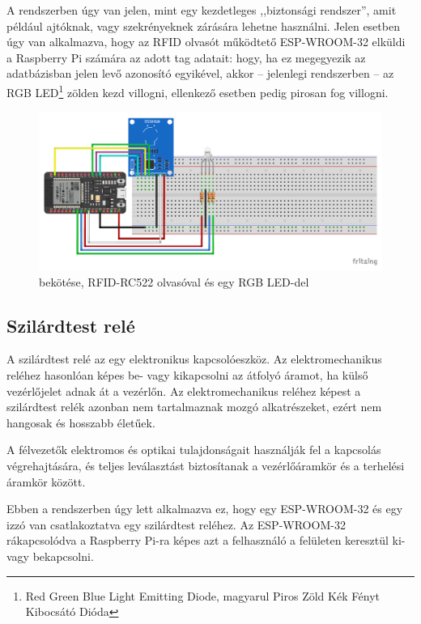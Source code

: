 \documentclass[
]{thesis-ekf}
\theoremstyle{definition}
\theoremstyle{remark}
\begin{document}
	A rendszerben úgy van jelen, mint egy kezdetleges ,,biztonsági rendszer'', amit például ajtóknak, vagy szekrényeknek zárására lehetne használni. Jelen esetben úgy van alkalmazva, hogy az RFID olvasót működtető ESP-WROOM-32 elküldi a Raspberry Pi számára az adott tag adatait: hogy, ha ez megegyezik az adatbázisban jelen levő azonosító egyikével, akkor -- jelenlegi rendszerben -- az RGB LED\footnote{\label{rgb-led}Red Green Blue Light Emitting Diode, magyarul Piros Zöld Kék Fényt Kibocsátó Dióda} zölden kezd villogni, ellenkező esetben pedig pirosan fog villogni.
	
	\begin{figure}[ht!]
		\centering
		\includegraphics[width=1\textwidth]{./src/schematics/RFID reader schematics_bb}
		\caption{ bekötése, RFID-RC522 olvasóval és egy RGB LED-del}
		\label{rfid-schematics}
	\end{figure}	
	
	\subsection{Szilárdtest relé}
	
	A szilárdtest relé az egy elektronikus kapcsolóeszköz. Az elektromechanikus reléhez hasonlóan képes be- vagy kikapcsolni az átfolyó áramot, ha külső vezérlőjelet adnak át a vezérlőn. Az elektromechanikus reléhez képest a szilárdtest relék azonban nem tartalmaznak mozgó alkatrészeket, ezért nem hangosak és hosszabb életűek. 
	
	A félvezetők elektromos és optikai tulajdonságait használják fel a kapcsolás végrehajtására, és teljes leválasztást biztosítanak a vezérlőáramkör és a terhelési áramkör között.\cite{solid-state-relay}
	
	Ebben a rendszerben úgy lett alkalmazva ez, hogy egy ESP-WROOM-32 és egy izzó van csatlakoztatva egy szilárdtest reléhez. Az ESP-WROOM-32 rákapcsolódva a Raspberry Pi-ra képes azt a felhasználó a felületen keresztül ki- vagy bekapcsolni.
	
\end{document}
